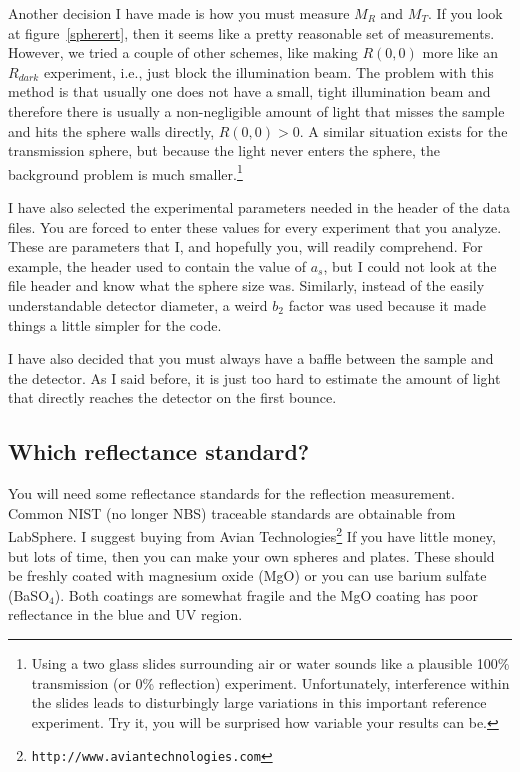 \documentclass{article}
\begin{document}
Another decision I have made is how you must measure $M_R$ and $M_T$.  If
you look at figure~\ref{spherert}, then it seems like a pretty reasonable
set of measurements.  However, we tried a couple of other schemes, like 
making $R(0,0)$ more like an $R_\mathit{dark}$ experiment, i.e., just block
the illumination beam.  The problem with this method is that usually
one does not have a small, tight illumination beam and therefore there is
usually a non-negligible amount of light that misses the sample and hits
the sphere walls directly, $R(0,0) > 0$.  A similar situation exists for
the transmission sphere, but because the light never enters the sphere,
the background problem is much smaller.\footnote{Using a two
glass slides surrounding air or water sounds like a plausible 100\%
transmission (or 0\% reflection) experiment.  Unfortunately, interference within the slides
leads to disturbingly large variations in this important reference
experiment. Try it, you will be surprised how variable your results
can be.}

I have also selected the experimental parameters needed in the header of the 
data files.  You are forced to enter these values for every experiment that
you analyze.  These are parameters that I, and hopefully you, will readily
comprehend.  For example, the header
used to contain the value of $a_s$, but I could not look at the file header and
know what the sphere size was.  Similarly, instead of the easily understandable
detector diameter, a weird $b_2$ factor was used because it made things a little 
simpler for the code. 

I have also decided that you must always have a baffle between the sample
and the detector.  As I said before, it is just too hard to estimate the
amount of light that directly reaches the detector on the first bounce.  

\subsection{Which reflectance standard?}

You will need some reflectance standards for the reflection measurement.  Common NIST (no longer NBS)
traceable standards are obtainable from LabSphere.  I suggest buying from
Avian Technologies\footnote{
\texttt{http://www.aviantechnologies.com}}
If you have little money, but lots of time, then you can make your
own spheres and plates.  These should be freshly coated with magnesium oxide
(MgO) or you can use barium sulfate (BaSO$_4$).  Both coatings are somewhat
fragile and the MgO coating has poor reflectance in the blue and UV region.
\end{document}
